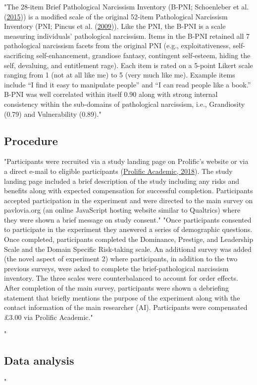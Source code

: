 \documentclass[
"  donotrepeattitle,doc, 12pt, a4paper,floatsintext]{apa7}"
\begin{document}
"The 28-item Brief Pathological Narcissism Inventory (B-PNI; Schoenleber et al. (\protect\hyperlink{ref-schoenleber2015}{2015})) is a modified scale of the original 52-item Pathological Narcissism Inventory (PNI; Pincus et al. (\protect\hyperlink{ref-pincus2009}{2009})). Like the PNI, the B-PNI is a scale measuring individuals' pathological narcissism. Items in the B-PNI retained all 7 pathological narcissism facets from the original PNI (e.g., exploitativeness, self-sacrificing self-enhancement, grandiose fantasy, contingent self-esteem, hiding the self, devaluing, and entitlement rage). Each item is rated on a 5-point Likert scale ranging from 1 (not at all like me) to 5 (very much like me). Example items include ``I find it easy to manipulate people'' and ``I can read people like a book.'' B-PNI was well correlated within itself 0.90 along with strong internal consistency within the sub-domains of pathological narcissism, i.e., Grandiosity (0.79) and Vulnerability (0.89)."
\hypertarget{procedure-1}{%
\subsection{Procedure}\label{procedure-1}}
"Participants were recruited via a study landing page on Prolific's website or via a direct e-mail to eligible participants (\protect\hyperlink{ref-prolificacademic2018}{Prolific Academic, 2018}). The study landing page included a brief description of the study including any risks and benefits along with expected compensation for successful completion. Participants accepted participation in the experiment and were directed to the main survey on pavlovia.org (an online JavaScript hosting website similar to Qualtrics) where they were shown a brief message on study consent."
"Once participants consented to participate in the experiment they answered a series of demographic questions. Once completed, participants completed the Dominance, Prestige, and Leadership Scale and the Domain Specific Risk-taking scale. An additional survey was added (the novel aspect of experiment 2) where participants, in addition to the two previous surveys, were asked to complete the brief-pathological narcissism inventory. The three scales were counterbalanced to account for order effects. After completion of the main survey, participants were shown a debriefing statement that briefly mentions the purpose of the experiment along with the contact information of the main researcher (AI). Participants were compensated £3.00 via Prolific Academic."
\hypertarget{data-analysis-1}{%
"\subsection{Data analysis}\label{data-analysis-1}}"
\end{document}
